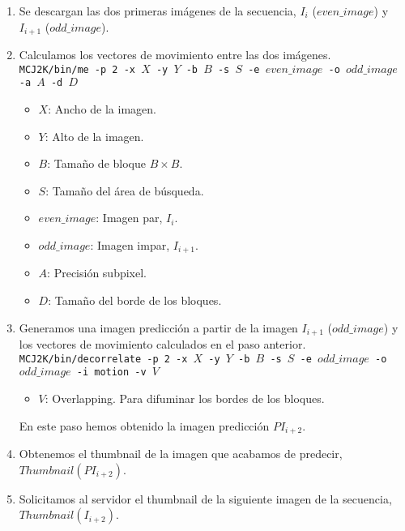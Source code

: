\documentclass[11pt,a4paper]{article}
\begin{document}
\begin{enumerate} 

  \item Se descargan las dos primeras im\'agenes de la secuencia, $I_i$
  ($even\_image$) y $I_{i+1}$ ($odd\_image$).

  \item Calculamos los vectores de movimiento entre las dos im\'agenes. \\ 
  {\color{blue}\texttt{MCJ2K/bin/me -p 2 -x $X$ -y $Y$ -b $B$ -s $S$ -e $even\_image$ -o $odd\_image$ -a $A$ -d $D$}}

    \begin{itemize}
      \item $X$: Ancho de la imagen.
      \item $Y$: Alto de la imagen.
      \item $B$: Tama\~no de bloque $B \times B$.
      \item $S$: Tama\~no del \'area de b\'usqueda.
      \item $even\_image$: Imagen par, $I_i$.
      \item $odd\_image$: Imagen impar, $I_{i+1}$.
      \item $A$: Precisi\'on subpixel.
      \item $D$: Tama\~no del borde de los bloques.
    \end{itemize}

  \item Generamos una imagen predicci\'on a partir de la imagen $I_{i+1}$
  ($odd\_image$) y los vectores de movimiento calculados en el paso anterior. \\
  {\color{blue}\texttt{MCJ2K/bin/decorrelate -p 2 -x $X$ -y $Y$ -b $B$ -s $S$ -e $odd\_image$ -o $odd\_image$ -i motion -v $V$}}

    \begin{itemize}
      \item $V$: Overlapping. Para difuminar los bordes de los bloques.
    \end{itemize}

  En este paso hemos obtenido la imagen predicci\'{o}n $PI_{i+2}$.

  \item Obtenemos el thumbnail de la imagen que acabamos de predecir, $Thumbnail(PI_{i+2})$.

  \item Solicitamos al servidor el thumbnail de la siguiente imagen de la
  secuencia, $Thumbnail(I_{i+2})$.


\end{enumerate}
\end{document}
